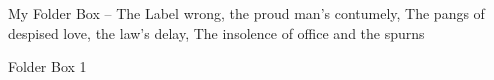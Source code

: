 \documentclass[landscape]{scrartcl}
\begin{document}
\begin{folderbox}{My Folder Box -- The Label}
{{wrong, the proud man's contumely,
The pangs of despised love, the law's delay,
The insolence of office and the spurns
}
}




\end{folderbox}




\begin{folderbox}{Folder Box 1}









\end{folderbox}
\end{document}
